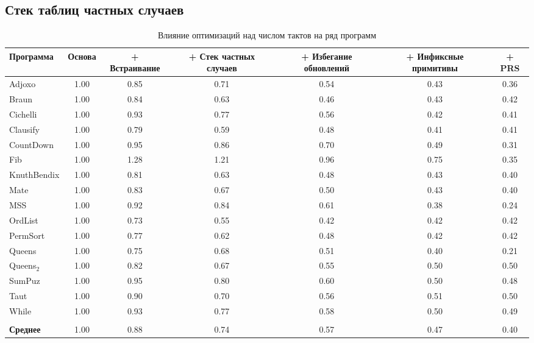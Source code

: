 \documentclass[flenqn, 14pt]{extarticle}
\begin{document}
\subsection{Стек таблиц частных случаев}
\begin{table}
\caption{Влияние оптимизаций над числом тактов на ряд программ}
\label{tab:clock-cycle_optimisations}
\begin{tabularx}{\textwidth}{L{1.3}C{0.7}C{1}C{1}C{1}C{1}C{1}}
\hline\hline
Программа & Основа & + Встраивание & + Стек частных случаев & + Избегание обновлений & + Инфиксные примитивы & + PRS \\
\hline
Adjoxo      & 1.00 & 0.85 & 0.71 & 0.54 & 0.43 & 0.36 \\
Braun       & 1.00 & 0.84 & 0.63 & 0.46 & 0.43 & 0.42 \\
Cichelli    & 1.00 & 0.93 & 0.77 & 0.56 & 0.42 & 0.41 \\
Clausify    & 1.00 & 0.79 & 0.59 & 0.48 & 0.41 & 0.41 \\
CountDown   & 1.00 & 0.95 & 0.86 & 0.70 & 0.49 & 0.31 \\
Fib         & 1.00 & 1.28 & 1.21 & 0.96 & 0.75 & 0.35 \\
KnuthBendix & 1.00 & 0.81 & 0.63 & 0.48 & 0.43 & 0.40 \\
Mate        & 1.00 & 0.83 & 0.67 & 0.50 & 0.43 & 0.40 \\
MSS         & 1.00 & 0.92 & 0.84 & 0.61 & 0.38 & 0.24 \\
OrdList     & 1.00 & 0.73 & 0.55 & 0.42 & 0.42 & 0.42 \\
PermSort    & 1.00 & 0.77 & 0.62 & 0.48 & 0.42 & 0.42 \\
Queens      & 1.00 & 0.75 & 0.68 & 0.51 & 0.40 & 0.21 \\
Queens$_2$  & 1.00 & 0.82 & 0.67 & 0.55 & 0.50 & 0.50 \\
SumPuz      & 1.00 & 0.95 & 0.80 & 0.60 & 0.50 & 0.48 \\
Taut        & 1.00 & 0.90 & 0.70 & 0.56 & 0.51 & 0.50 \\
While       & 1.00 & 0.93 & 0.77 & 0.58 & 0.50 & 0.49 \\
            &      &      &      &      &      &      \\
\textbf{Среднее} & 1.00 & 0.88 & 0.74 & 0.57 & 0.47 & 0.40 \\       
\hline\hline
\end{tabularx}
\end{table}
\end{document}
